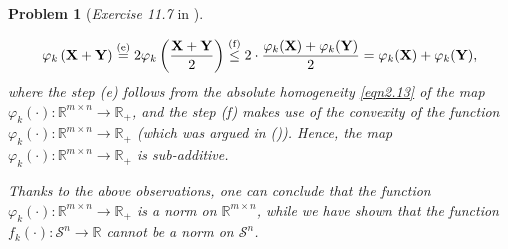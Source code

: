 \documentclass[11pt]{article}
\newtheorem{problem}{Problem}
\numberwithin{equation}{problem}
\begin{document}
\begin{problem} [\emph{Exercise 11.7} in \cite{calafiore2014optimization}]
{\begin{enumerate} [label=(\roman*)]
\begin{itemize}
        \begin{equation*}
            \begin{split}
                \varphi_k \left( \mathbf{X} + \mathbf{Y} \right)
                \stackrel{\textnormal{(e)}}{=} 2 \varphi_k \left( \frac{\mathbf{X} + \mathbf{Y}}{2} \right)
                \stackrel{\textnormal{(f)}}{\leq} 2 \cdot \frac{\varphi_k (\mathbf{X}) + \varphi_k (\mathbf{Y})}{2} = \varphi_k (\mathbf{X}) + \varphi_k (\mathbf{Y}),
            \end{split}
        \end{equation*}
        where the step (e) follows from the absolute homogeneity \eqref{eqn2.13} of the map $\varphi_k (\cdot): \mathbb{R}^{m \times n} \rightarrow \mathbb{R}_{+}$, and the step (f) makes use of the convexity of the function $\varphi_k (\cdot): \mathbb{R}^{m \times n} \rightarrow \mathbb{R}_{+}$ (which was argued in ()). Hence, the map $\varphi_k (\cdot): \mathbb{R}^{m \times n} \rightarrow \mathbb{R}_{+}$ is sub-additive.
    \end{itemize}
    Thanks to the above observations, one can conclude that the function $\varphi_k (\cdot): \mathbb{R}^{m \times n} \rightarrow \mathbb{R}_{+}$ is a norm on $\mathbb{R}^{m \times n}$, while we have shown that the function $f_k (\cdot) : \mathcal{S}^n \rightarrow \mathbb{R}$ cannot be a norm on $\mathcal{S}^n$.
\end{enumerate}
}
\end{problem}

\newpage



\end{document}

